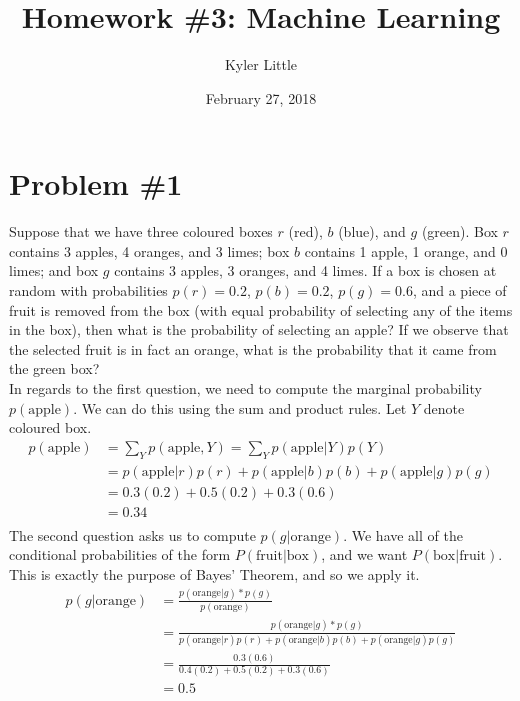 \documentclass[12pt]{article}
\author{Kyler Little\vspace{-0.6cm}}
\title{Homework \#3: Machine Learning\vspace{-0.3cm}}
\date{February 27, 2018\vspace{-0.7cm}}
\begin{document}
	\maketitle
	\section*{Problem \#1}
	Suppose that we have three coloured boxes $r$ (red), $b$ (blue), and $g$ (green). Box $r$ contains 3 apples, 4 oranges, and 3 limes; box $b$ contains 1 apple, 1 orange, and 0 limes; and box $g$ contains 3 apples, 3 oranges, and 4 limes. If a box is chosen at random with probabilities $p(r) = 0.2$, $p(b) = 0.2$, $p(g) = 0.6$, and a piece of fruit is removed from the box (with equal probability of selecting any of the items in the box), then what is the probability of selecting an apple? If we observe that the selected fruit is in fact an orange, what is the probability that it came from the green box? \\
	In regards to the first question, we need to compute the marginal probability $p(\text{apple})$. We can do this using the sum and product rules. Let $Y$ denote coloured box.
	\begin{align*}
	p(\text{apple}) &= \sum_{Y}^{} p(\text{apple}, Y) = \sum_{Y}^{} p(\text{apple} \vert Y) p(Y) \\
	&= p(\text{apple} \vert r) p(r) + p(\text{apple} \vert b) p(b) + p(\text{apple} \vert g) p(g)\\
	&= 0.3(0.2) + 0.5(0.2) + 0.3(0.6) \\
	&= 0.34\\
	\end{align*}
	The second question asks us to compute $p(g \vert \text{orange})$. We have all of the conditional probabilities of the form $P(\text{fruit} \vert \text{box})$, and we want $P(\text{box} \vert \text{fruit})$. This is exactly the purpose of Bayes' Theorem, and so we apply it.
	\begin{align*}
	p(g \vert \text{orange}) &= \frac{p(\text{orange} \vert g) * p(g)}{p(\text{orange})} \\
	&= \frac{p(\text{orange} \vert g) * p(g)}{p(\text{orange} \vert r) p(r) + p(\text{orange} \vert b) p(b) + p(\text{orange} \vert g) p(g)}\\
	&= \frac{0.3(0.6)}{0.4(0.2) + 0.5(0.2) + 0.3(0.6)} \\
	&= 0.5
	\end{align*}
	 
\end{document}
